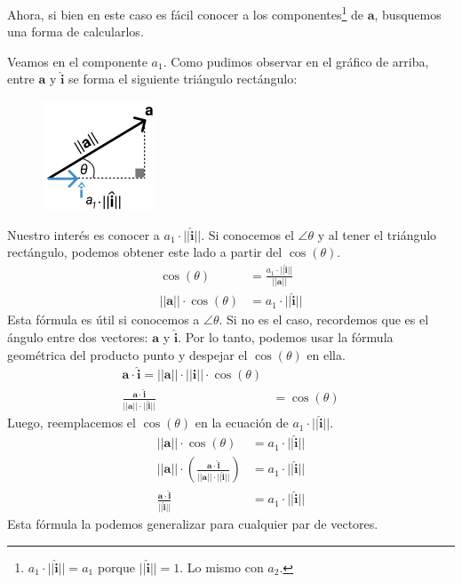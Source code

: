 \documentclass[12pt]{article}
\begin{document}
Ahora, si bien en este caso es fácil conocer a los componentes\footnote{$a_{1} \cdot ||\hat{\mathbf{i}}|| = a_{1}$ porque $||\hat{\mathbf{i}}|| = 1$. Lo mismo con $a_{2}$.} de $\mathbf{a}$, busquemos una forma de calcularlos.

Veamos en el componente $a_{1}$. Como pudimos observar en el gráfico de arriba, entre $\mathbf{a}$ y $\hat{\mathbf{i}}$ se forma el siguiente triángulo rectángulo:

\begin{figure}[hbt!]
\centering
\includegraphics[scale=0.7]{img/vect-along-other-2.jpg}
\end{figure}

Nuestro interés es conocer a $a_{1} \cdot ||\hat{\mathbf{i}}||$. Si conocemos el $\angle \theta$ y al tener el triángulo rectángulo, podemos obtener este lado a partir del $\cos(\theta)$.
\begin{align*}
  \cos(\theta) &= \frac{a_{1} \cdot ||\hat{\mathbf{i}}||}{||\mathbf{a}||} \\
  ||\mathbf{a}|| \cdot \cos(\theta) &= a_{1} \cdot ||\hat{\mathbf{i}}||
\end{align*}
Esta fórmula es útil si conocemos a $\angle \theta$. Si no es el caso, recordemos que es el ángulo entre dos vectores: $\mathbf{a}$ y $\hat{\mathbf{i}}$. Por lo tanto, podemos usar la fórmula geométrica del producto punto y despejar el $\cos(\theta)$ en ella.
\begin{align*}
  \mathbf{a} \cdot \hat{\mathbf{i}} = ||\mathbf{a}|| \cdot ||\hat{\mathbf{i}}|| \cdot \cos(\theta) \\
  \frac{\mathbf{a} \cdot \hat{\mathbf{i}}}{||\mathbf{a}|| \cdot ||\hat{\mathbf{i}}||} &= \cos(\theta) 
\end{align*}
Luego, reemplacemos el $\cos(\theta)$ en la ecuación de $a_{1} \cdot ||\hat{\mathbf{i}}||$.
\begin{align*}
||\mathbf{a}|| \cdot \cos(\theta) &= a_{1} \cdot ||\hat{\mathbf{i}}|| \\
||\mathbf{a}|| \cdot \left(\frac{\mathbf{a} \cdot \hat{\mathbf{i}}}{||\mathbf{a}|| \cdot ||\hat{\mathbf{i}}||}\right) &= a_{1} \cdot ||\hat{\mathbf{i}}|| \\
\frac{\mathbf{a} \cdot \hat{\mathbf{i}}}{||\hat{\mathbf{i}}||} &= a_{1} \cdot ||\hat{\mathbf{i}}|| 
\end{align*}
Esta fórmula la podemos generalizar para cualquier par de vectores.
\end{document}
